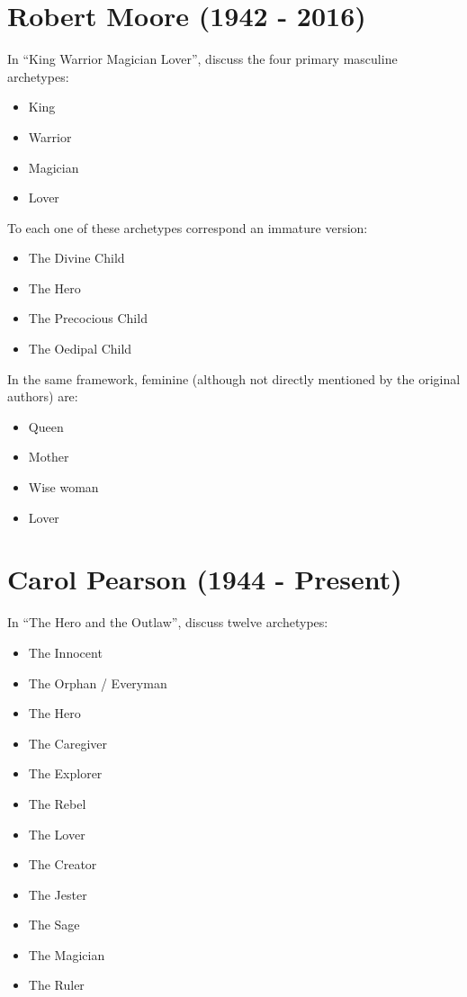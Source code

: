 \documentclass[
]{book}
\providecommand{\tightlist}{%
  \setlength{\itemsep}{0pt}\setlength{\parskip}{0pt}}
\begin{document}
\hypertarget{robert-moore-1942---2016}{%
\section{Robert Moore (1942 - 2016)}\label{robert-moore-1942---2016}}

In ``King Warrior Magician Lover'', \citet{moore1991king} discuss the four primary masculine archetypes:

\begin{itemize}
\tightlist
\item
  King
\item
  Warrior
\item
  Magician
\item
  Lover
\end{itemize}

To each one of these archetypes correspond an immature version:

\begin{itemize}
\tightlist
\item
  The Divine Child
\item
  The Hero
\item
  The Precocious Child
\item
  The Oedipal Child
\end{itemize}

In the same framework, feminine (although not directly mentioned by the original authors) are:

\begin{itemize}
\tightlist
\item
  Queen
\item
  Mother
\item
  Wise woman
\item
  Lover
\end{itemize}

\hypertarget{carol-pearson-1944---present}{%
\section{Carol Pearson (1944 - Present)}\label{carol-pearson-1944---present}}

In ``The Hero and the Outlaw'', \citet{mark2001hero} discuss twelve archetypes:

\begin{itemize}
\tightlist
\item
  The Innocent
\item
  The Orphan / Everyman
\item
  The Hero
\item
  The Caregiver
\item
  The Explorer
\item
  The Rebel
\item
  The Lover
\item
  The Creator
\item
  The Jester
\item
  The Sage
\item
  The Magician
\item
  The Ruler
\end{itemize}
\end{document}
